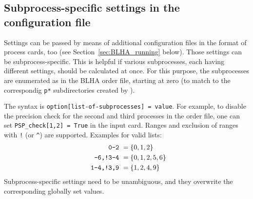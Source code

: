 \subsection{Subprocess-specific settings in the \gosam configuration file}
Settings can be passed by means of additional configuration files in the format of \gosam process cards, too (see Section~\ref{sec:BLHA_running} below). Those settings can be subprocess-specific. This is helpful if various subprocesses, each having different settings, should be calculated at once. For this purpose, the subprocesses are enumerated as in the BLHA order file, starting at zero (to match to the correspondig \texttt{p*} subdirectories created by \gosam{}).


The syntax is \lstinline[style=sh]|option[list-of-subprocesses] = value|. For example, to disable the precision check for the second and third processes in the order file, one can set \lstinline[style=sh]|PSP_check[1,2] = True| in the input card. Ranges and exclusion of ranges with \texttt{!} (or \texttt{\^}) are supported. Examples for valid lists:
\begin{align*}
    \text{\texttt{0-2}         }     &= \{0,1,2\} \\
    \text{\texttt{-6,!3-4}         }  &   = \{0,1,2,5,6\} \\
    \text{\texttt{ 1-4,!3,9}       }   &   = \{1,2,4,9\}
\end{align*}
Subprocess-specific settings need to be unambiguous, and they overwrite the corresponding globally set values.

%
%
%
%


